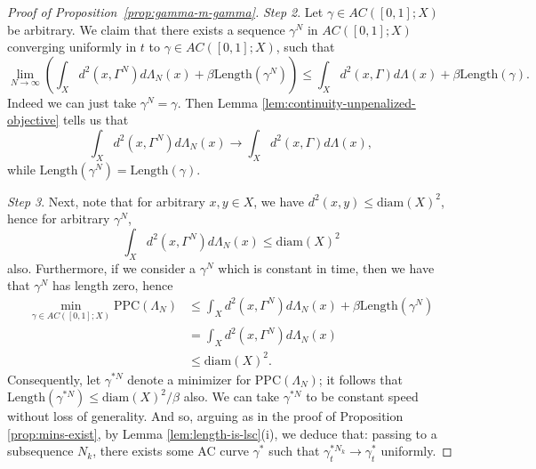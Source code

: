 \documentclass[aos, preprint]{imsart}
\theoremstyle{plain}
\theoremstyle{remark}
\begin{document}
\begin{appendix}
\begin{proof}[Proof of Proposition~\ref{prop:gamma-m-gamma}]
  \emph{Step 2}. Let $\gamma\in AC([0,1];X)$ be arbitrary. We claim
  that there exists a sequence $\gamma^{N}$ in $AC([0,1];X)$
  converging uniformly in $t$ to $\gamma\in AC([0,1];X)$, such that
  \[
    \lim_{N\rightarrow\infty} \left( \int_{X}d^{2}(x,\Gamma^{N})
      d\Lambda_{N}(x) + \beta \text{Length}(\gamma^{N}) \right) \leq
    \int_{X} d^{2}(x,\Gamma) d\Lambda(x) + \beta \text{Length}(\gamma).
  \]
  Indeed we can just take $\gamma^N = \gamma$. Then Lemma
  \ref{lem:continuity-unpenalized-objective} tells us that
  \[
    \int_{X}d^{2}(x,\Gamma^{N})d\Lambda_{N}(x) \rightarrow
    \int_{X}d^{2}(x,\Gamma)d\Lambda(x),
  \]
  while $\text{Length}(\gamma^{N})=\text{Length}(\gamma).$

  \emph{Step 3}. Next, note that for arbitrary $x,y\in X$, we have
  $d^{2}(x,y)\leq\text{diam}(X)^{2}$, hence for arbitrary $\gamma^N$,
  \[
    \int_{X}d^{2}(x,\Gamma^{N})d\Lambda_{N}(x)\leq\text{diam}(X)^{2}
  \]
  also. Furthermore, if we consider a $\gamma^{N}$ which is constant
  in time, then we have that $\gamma^{N}$ has length zero, hence
  \begin{align*}
    \min_{\gamma \in AC([0,1];X)}\text{PPC}(\Lambda_{N})
    & \leq\int_{X} d^{2}(x,\Gamma^{N}) d\Lambda_{N}(x) +
      \beta\text{Length}(\gamma^{N})\\
    & =\int_{X} d^{2}(x,\Gamma^{N}) d\Lambda_{N}(x)\\
    & \leq\text{diam}(X)^{2}.
  \end{align*}
  Consequently, let $\gamma^{*N}$ denote a minimizer for
  $\text{PPC}(\Lambda_{N})$; it follows that
  $\text{Length}(\gamma^{*N}) \leq \text{diam}(X)^{2} / \beta$ also. We can take $\gamma^{*N}$ to be
  constant speed without loss of generality. And so, arguing as in the
  proof of Proposition \ref{prop:mins-exist}, by Lemma
  \ref{lem:length-is-lsc}(i), we deduce that: passing to a subsequence $N_{k}$,
  there exists some AC curve $\gamma^{*}$ such that
  $\gamma_{t}^{*N_{k}}\rightarrow\gamma_{t}^{*}$ uniformly.


\end{proof}
\end{appendix}
\end{document}
